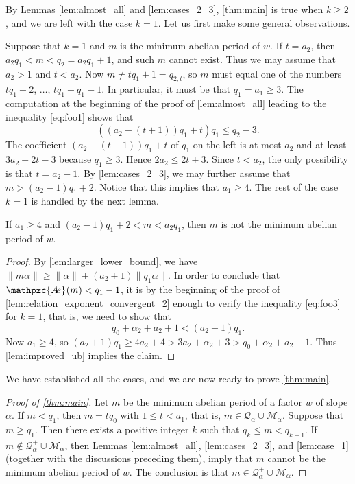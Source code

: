 \documentclass[a4paper,fleqn]{article}
\providecommand{\norm}[1]{\lVert#1\rVert}
\newcommand{\abexp}[2][]{\mathpzc{A\mkern-3mu e}_{#1}(#2)}
\newcommand{\qk}[1]{\mathcal{Q}_{#1}}
\newcommand{\qkl}[1]{\mathcal{Q}^+_{#1}}
\begin{document}
  By Lemmas \ref{lem:almost_all} and \ref{lem:cases_2_3}, \autoref{thm:main} is true when $k \geq 2$, and we are left
  with the case $k = 1$. Let us first make some general observations.

  Suppose that $k = 1$ and $m$ is the minimum abelian period of $w$. If $t = a_2$, then
  $a_2 q_1 < m < q_2 = a_2 q_1 + 1$, and such $m$ cannot exist. Thus we may assume that $a_2 > 1$ and $t < a_2$. Now
  $m \neq tq_1 + 1 = q_{2,t}$, so $m$ must equal one of the numbers $tq_1 + 2$, $\ldots$, $tq_1 + q_1 - 1$. In
  particular, it must be that $q_1 = a_1 \geq 3$. The computation at the beginning of the proof of
  \autoref{lem:almost_all} leading to the inequality \eqref{eq:foo1} shows that
  \begin{equation*}
    ((a_2 - (t + 1))q_1 + t)q_1 \leq q_2 - 3.
  \end{equation*}
  The coefficient $(a_2 - (t + 1))q_1 + t$ of $q_1$ on the left is at most $a_2$ and at least $3a_2 - 2t - 3$ because
  $q_1 \geq 3$. Hence $2a_2 \leq 2t + 3$. Since $t < a_2$, the only possibility is that $t = a_2 - 1$. By
  \autoref{lem:cases_2_3}, we may further assume that $m > (a_2 - 1)q_1 + 2$. Notice that this implies that
  $a_1 \geq 4$. The rest of the case $k = 1$ is handled by the next lemma.

  \begin{lemma}\label{lem:case_1}
    If $a_1 \geq 4$ and $(a_2 - 1)q_1 + 2 < m < a_2 q_1$, then $m$ is not the minimum abelian period of $w$.
  \end{lemma}
  \begin{proof}
    By \autoref{lem:larger_lower_bound}, we have $\norm{m\alpha} \geq \norm{\alpha} + (a_2 + 1)\norm{q_1\alpha}$. In
    order to conclude that $\abexp{m} < q_1 - 1$, it is by the beginning of the proof of
    \autoref{lem:relation_exponent_convergent_2} enough to verify the inequality \eqref{eq:foo3} for $k = 1$, that is,
    we need to show that
    \begin{equation*}
      q_0 + \alpha_2 + a_2 + 1 < (a_2 + 1)q_1.
    \end{equation*}
    Now $a_1 \geq 4$, so $(a_2 + 1)q_1 \geq 4a_2 + 4 > 3a_2 + \alpha_2 + 3 > q_0 + \alpha_2 + a_2 + 1$. Thus
    \autoref{lem:improved_ub} implies the claim.
  \end{proof}

  We have established all the cases, and we are now ready to prove \autoref{thm:main}.

  \begin{proof}[Proof of \autoref{thm:main}]
    Let $m$ be the minimum abelian period of a factor $w$ of slope $\alpha$. If $m < q_1$, then $m = t q_0$ with
    $1 \leq t < a_1$, that is, $m \in \qk{\alpha} \cup \mathcal{M}_\alpha$. Suppose that $m \geq q_1$. Then there
    exists a positive integer $k$ such that $q_k \leq m < q_{k+1}$. If $m \notin \qkl{\alpha} \cup \mathcal{M}_\alpha$,
    then Lemmas \ref{lem:almost_all}, \ref{lem:cases_2_3}, and \ref{lem:case_1} (together with the discussions
    preceding them), imply that $m$ cannot be the minimum abelian period of $w$. The conclusion is that
    $m \in \qkl{\alpha} \cup \mathcal{M}_\alpha$.
  \end{proof}
\end{document}
